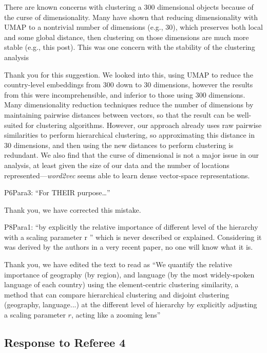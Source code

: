 \documentclass[12pt,a4paper]{article}
\newcommand{\response}[1]{{\noindent #1}}
\newcommand{\rcomment}[1]{%
\vspace{10pt}
\begin{tcolorbox}[colback=black!3,colframe=white!45!black, left=0pt, right=0pt, top=0pt, bottom=0pt, arc=0pt,outer arc=0pt, grow to left by=-0.5cm,grow to right by=-0.5cm]
#1
\end{tcolorbox}
}
\begin{document}
\rcomment{
There are known concerns with clustering a 300 dimensional objects because of the curse of
dimensionality. Many have shown that reducing dimensionality with UMAP to a nontrivial
number of dimensions (e.g., 30), which preserves both local and some global distance, then
clustering on those dimensions are much more stable (e.g., this post). This was one
concern with the stability of the clustering analysis


}

\response{Thank you for this suggestion. 
We looked into this, using UMAP to reduce the country-level embeddings from 300 down to 30 dimensions, however the results from this were incomprehensible, and inferior to those using 300 dimensions. 
Many dimensionality reduction techniques reduce the number of dimensions by maintaining pairwise distances between vectors, so that the result can be well-suited for clustering algorithms. 
However, our approach already uses raw pairwise similarities to perform hierarchical clustering, so approximating this distance in 30 dimensions, and then using the new distances to perform clustering is redundant. 
We also find that the curse of dimensional is not a major issue in our analysis, at least given the size of our data and the number of locations represented---\textit{word2vec} seems able to learn dense vector-space representations.
}

\rcomment{
P6Para3: “For THEIR purpose…”
}

\response{Thank you, we have corrected this mistake. 
}

\rcomment{
P8Para1: “by explicitly the relative importance of different level of the hierarchy with a scaling parameter r ” which is never described or explained. Considering it was derived by the authors in a very recent paper, no one will know what it is.
}

\response{Thank you, we have edited the text to read as “We quantify the relative importance of geography (by region), and language (by the most widely-spoken language of each country) using the element-centric clustering similarity, a method that can compare hierarchical clustering and disjoint clustering (geography, language...) at the different level of hierarchy by explicitly adjusting a scaling parameter $r$, acting like a zooming lens”
}

\subsection{Response to Referee 4}
\end{document}
